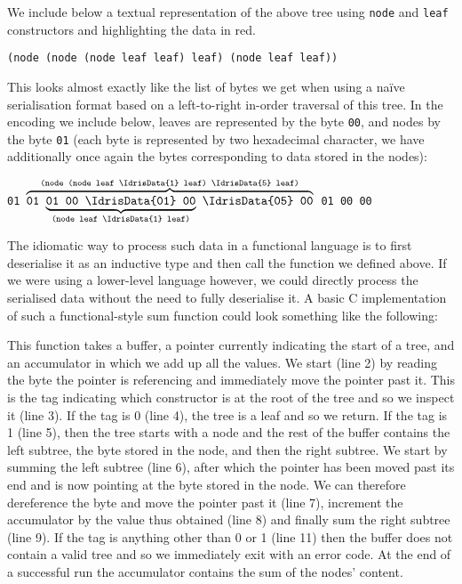 We include below a textual representation of the above tree using
\texttt{node} and \texttt{leaf} constructors and highlighting the
data in red.

\medskip
  \texttt{(node (node (node leaf  leaf)  leaf)  (node leaf  leaf))}
\medskip

This looks almost exactly like the list of bytes we get when using a
naïve serialisation format based on a left-to-right in-order traversal
of this tree.
%
In the encoding we include below,
leaves are represented by the byte \texttt{00},
and nodes by the byte \texttt{01}
(each byte is represented by two hexadecimal character,
we have additionally once again  the bytes
corresponding to data stored in the nodes):

\medskip
\texttt{01 $\overbrace{\texttt{01 $\underbrace{\texttt{01 00 \IdrisData{01} 00}}_{\texttt{(node leaf \IdrisData{1} leaf)}}$
    \IdrisData{05} 00}}^{\texttt{(node (node leaf \IdrisData{1} leaf) \IdrisData{5} leaf)}}$
     01 00  00}
\medskip

The idiomatic way to process such data in a functional language
is to first deserialise it as an inductive type and then call
the  function we defined above.
%
If we were using a lower-level language however, we could directly
process the serialised data without the need to fully deserialise it.
%
A basic C implementation of such a functional-style sum function
could look something like the following:



This function takes a buffer, a pointer currently indicating the start of
a tree, and an accumulator in which we add up all the values.
%
We start (line 2) by reading the byte the pointer is referencing and
immediately move the pointer past it.
%
This is the tag indicating which constructor is at the root of the tree
and so we inspect it (line 3).
%
If the tag is 0 (line 4), the tree is a leaf and so we return.
%
If the tag is 1 (line 5), then the tree starts with a node and the rest
of the buffer contains the left subtree, the byte stored in the node,
and then the right subtree.
%
We start by summing the left subtree (line 6),
after which the pointer has been moved past its end and is now pointing
at the byte stored in the node.
We can therefore dereference the byte and move the pointer past it (line 7),
increment the accumulator by the value thus obtained (line 8)
and finally sum the right subtree (line 9).
%
If the tag is anything other than 0 or 1 (line 11) then the buffer does not
contain a valid tree and so we immediately exit with an error code.
%
At the end of a successful run the accumulator contains the sum of the nodes' content.


